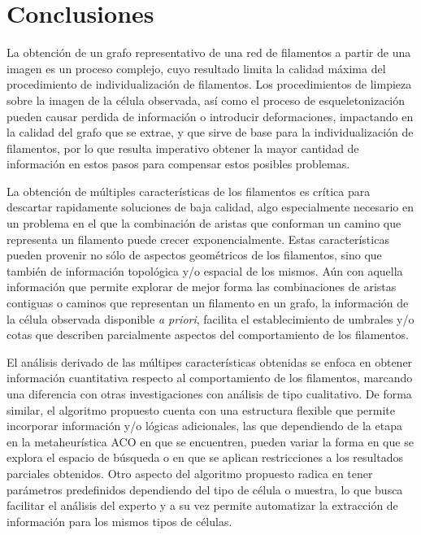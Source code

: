 \chapter{Conclusiones}
\label{chap:conclu}
La obtenci\'on de un grafo representativo de una red de filamentos a partir de una imagen es un proceso complejo, cuyo resultado limita la calidad m\'axima del procedimiento de individualizaci\'on de filamentos. Los procedimientos de limpieza sobre la imagen de la c\'elula observada, as\'i como el proceso de esqueletonizaci\'on pueden causar perdida de informaci\'on o introducir deformaciones, impactando en la calidad del grafo que se extrae, y que sirve de base para la individualizaci\'on de filamentos, por lo que resulta imperativo obtener la mayor cantidad de informaci\'on en estos pasos para compensar estos posibles problemas. 

La obtenci\'on de m\'ultiples caracter\'isticas de los filamentos es cr\'itica para descartar rapidamente soluciones de baja calidad, algo especialmente necesario en un problema en el que la combinaci\'on de aristas que conforman un camino que representa un filamento puede crecer exponencialmente. Estas caracter\'isticas pueden provenir no s\'olo de aspectos geom\'etricos de los filamentos, sino que tambi\'en de informaci\'on topol\'ogica y/o espacial de los mismos.
A\'un con aquella informaci\'on que permite explorar de mejor forma las combinaciones de aristas contiguas o caminos que representan un filamento en un grafo, la informaci\'on de la c\'elula observada disponible {\it a priori}, facilita el establecimiento de umbrales y/o cotas que describen parcialmente aspectos del comportamiento de los filamentos.

El an\'alisis derivado de las m\'ultipes caracter\'isticas obtenidas se enfoca en obtener informaci\'on cuantitativa respecto al comportamiento de los filamentos, marcando una diferencia con otras investigaciones con an\'alisis de tipo cualitativo. De forma similar, el algoritmo propuesto cuenta con una estructura flexible que permite incorporar informaci\'on y/o l\'ogicas adicionales, las que dependiendo de la etapa en la metaheur\'istica ACO en que se encuentren, pueden variar la forma en que se explora el espacio de b\'usqueda o en que se aplican restricciones a los resultados parciales obtenidos. Otro aspecto del algoritmo propuesto radica en tener par\'ametros predefinidos dependiendo del tipo de c\'elula o muestra, lo que busca facilitar el an\'alisis del experto y a su vez permite automatizar la extracci\'on de informaci\'on para los mismos tipos de c\'elulas.


